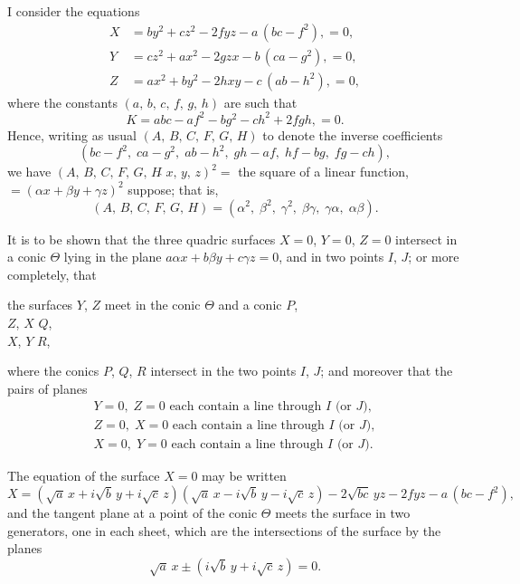 \documentclass[11pt,a4paper]{article}
\theoremstyle{plain}
\theoremstyle{definition}
\theoremstyle{remark}
\begin{document}
I consider the equations
\begin{align*}
X &= by^2 + cz^2 - 2fyz - a\,(bc-f^2), = 0,\\
Y &= cz^2 + ax^2 - 2gzx - b\,(ca-g^2), = 0,\\
Z &= ax^2 + by^2 - 2hxy - c\,(ab-h^2), = 0,
\end{align*}
where the constants $(a,\, b,\, c,\, f,\, g,\, h)$ are such that
\[
K = abc - af^2 - bg^2 - ch^2 + 2fgh, = 0.
\]
Hence, writing as usual $(A,\, B,\, C,\, F,\, G,\, H)$ to denote the inverse coefficients
\[
(bc-f^2,\; ca-g^2,\; ab-h^2,\; gh-af,\; hf-bg,\; fg-ch),
\]
we have $(A,\, B,\, C,\, F,\, G,\, H\!\!\widehat{\,}\, x,\, y,\, z)^2 =$ the square of a linear function, $= (\alpha x + \beta y + \gamma z)^2$ suppose; that is,
\[
(A,\, B,\, C,\, F,\, G,\, H) = (\alpha^2,\; \beta^2,\; \gamma^2,\; \beta\gamma,\; \gamma\alpha,\; \alpha\beta).
\]

It is to be shown that the three quadric surfaces $X = 0$, $Y = 0$, $Z = 0$ intersect in a conic $\Theta$ lying in the plane $a\alpha x + b\beta y + c\gamma z = 0$, and in two points $I$, $J$; or more completely, that
\begin{center}
the surfaces $Y$, $Z$ meet in the conic $\Theta$ and a conic $P$,\\
\quad\quad\quad $Z$, $X$ \quad\quad\quad\quad\quad\quad\quad\quad\quad\quad\quad\quad\quad\quad\quad $Q$,\\
\quad\quad\quad $X$, $Y$ \quad\quad\quad\quad\quad\quad\quad\quad\quad\quad\quad\quad\quad\quad\quad $R$,
\end{center}
where the conics $P$, $Q$, $R$ intersect in the two points $I$, $J$; and moreover that the pairs of planes
\begin{align*}
Y = 0,\; Z = 0 \text{ each contain a line through } I \text{ (or } J),\\
Z = 0,\; X = 0 \text{ each contain a line through } I \text{ (or } J),\\
X = 0,\; Y = 0 \text{ each contain a line through } I \text{ (or } J).
\end{align*}

The equation of the surface $X = 0$ may be written
\[
X = (\sqrt{a}\,x + i\sqrt{b}\,y + i\sqrt{c}\,z)(\sqrt{a}\,x - i\sqrt{b}\,y - i\sqrt{c}\,z) - 2\sqrt{bc}\,yz - 2fyz - a\,(bc-f^2),
\]
and the tangent plane at a point of the conic $\Theta$ meets the surface in two generators, one in each sheet, which are the intersections of the surface by the planes
\[
\sqrt{a}\,x \pm (i\sqrt{b}\,y + i\sqrt{c}\,z) = 0.
\]
\end{document}
